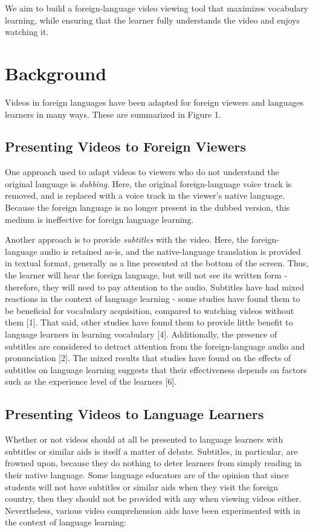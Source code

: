 \documentclass{sigchi}
\begin{document}
We aim to build a foreign-language video viewing tool
that maximizes vocabulary learning, while ensuring that the learner
fully understands the video and enjoys watching it.

\section{Background}

Videos in foreign languages have been adapted for foreign viewers and languages learners in many ways. These are summarized in Figure 1.

\subsection{Presenting Videos to Foreign Viewers}

One approach used to adapt videos to viewers who do not understand the original language is \emph{dubbing}. Here, the original foreign-language voice track is removed, and is replaced with a voice track in the viewer's native language.
Because the foreign language is no longer present in the dubbed version, this medium is ineffective for foreign language learning.

Another approach is to provide \emph{subtitles} with the video. Here, the foreign-language audio is retained as-is, and the native-language translation is provided in textual format, generally as a line presented at the bottom of the screen.
Thus, the learner will hear the foreign language, but will not see its written form - therefore, they will need to pay attention to the audio.
Subtitles have had mixed reactions in the context of language learning - some studies have found them to be beneficial for vocabulary acquisition, compared to watching videos without them [1].
That said, other studies have found them to provide little benefit to language learners in learning vocabulary [4]. Additionally, the presence of subtitles are considered to detract attention from the foreign-language audio and pronunciation [2].
The mixed results that studies have found on the effects of subtitles on language learning suggests that their effectiveness depends on factors such as the experience level of the learners [6].

\subsection{Presenting Videos to Language Learners}

Whether or not videos should at all be presented to language learners with subtitles or similar aids is itself a matter of debate. Subtitles, in particular, are frowned upon, because they do nothing to deter learners from simply reading in their native language. Some language educators are of the opinion that since students will not have subtitles or similar aids when they visit the foreign country, then they should not be provided with any when viewing videos either. Nevertheless, various video comprehension aids have been experimented with in the context of language learning:
\end{document}
